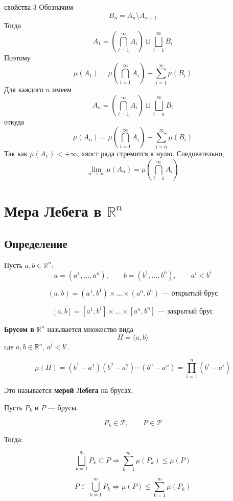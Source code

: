 \documentclass[12pt,a4paper]{article}
\begin{document}
\begin{proofbox}{свойства 3}
    Обозначим
    \[
        B_n=A_n\setminus A_{n+1}
    \]
    Тогда
    \[
        A_1=
        \left(\bigcap_{i=1}^{\infty}A_i\right)
        \sqcup
        \bigsqcup_{i=1}^{\infty}B_i
    \]
    Поэтому
    \[
        \mu(A_1)
        =
        \mu\left(\bigcap_{i=1}^{\infty}A_i\right)
        +
        \sum_{i=1}^{\infty}\mu(B_i)
    \]
    Для каждого $n$ имеем
    \[
        A_n=
        \left(\bigcap_{i=1}^{\infty}A_i\right)
        \sqcup
        \bigsqcup_{i=n}^{\infty}B_i
    \]
    откуда
    \[
        \mu(A_n)
        =
        \mu\left(\bigcap_{i=1}^{\infty}A_i\right)
        +
        \sum_{i=n}^{\infty}\mu(B_i)
    \]
    Так как $\mu(A_1)<+\infty$, хвост ряда стремится к нулю. Следовательно,
    \[
        \lim_{n\to\infty}\mu(A_n)
        =
        \mu\left(\bigcap_{i=1}^{\infty}A_i\right)
    \]
\end{proofbox}


\newpage

\section{Мера Лебега в \texorpdfstring{$\mathbb{R}^n$}{Rⁿ}}

\subsection{Определение}

Пусть $a,b\in\mathbb{R}^n$:
\[
    a=(a^1,\ldots,a^n),\qquad b=(b^1,\ldots,b^n),\qquad a^i<b^i
\]

\[
    (a,b)=(a^1,b^1)\times\ldots\times(a^n,b^n) \text{ — открытый брус}
\]

\[
    [a,b]=[a^1,b^1]\times\ldots\times[a^n,b^n] \text{ — закрытый брус}
\]

\begin{definition}
    \textbf{Брусом в $\mathbb{R}^n$} называется множество вида
    \[
        \Pi=\langle a,b\rangle
    \]
    где $a,b\in\mathbb{R}^n$, $a^i<b^i$.

    \[
        \mu(\Pi)=(b^1-a^1)(b^2-a^2)\cdots(b^n-a^n)
        =\prod_{i=1}^n(b^i-a^i)
    \]

    Это называется \textbf{мерой Лебега} на брусах.
\end{definition}

\begin{lemma}{}
    Пусть $P_k$ и $P$ --- брусы.

    \[
        P_k\in\mathcal P,\qquad P\in\mathcal P
    \]

    Тогда:

    \[
        \bigsqcup_{k=1}^{m}P_k\subset P \Longrightarrow \sum_{k=1}^{m}\mu(P_k)\leq\mu(P)
    \]

    \[
        P\subset\bigcup_{k=1}^{m}P_k \Longrightarrow \mu(P)\leq\sum_{k=1}^{m}\mu(P_k)
    \]
\end{lemma}
\end{document}
